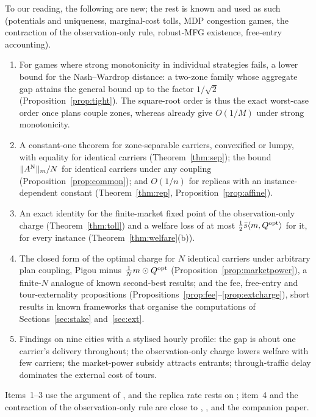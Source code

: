 \documentclass[preprint,11pt,authoryear]{elsarticle}
\theoremstyle{plain}
\theoremstyle{remark}
\begin{document}
To our reading, the following are new; the rest is known and used as such (potentials and uniqueness, marginal-cost tolls, MDP congestion games, the contraction of the observation-only rule, robust-MFG existence, free-entry accounting).
\begin{enumerate}
\item For games where strong monotonicity in individual strategies fails, a lower bound for the Nash--Wardrop distance: a two-zone family whose aggregate gap attains the general bound up to the factor $1/\sqrt2$ (Proposition~\ref{prop:tight}). The square-root order is thus the exact worst-case order once plans couple zones, whereas \citet{Paccagnan2019} already give $O(1/M)$ under strong monotonicity.
\item A constant-one theorem for zone-separable carriers, convexified or lumpy, with equality for identical carriers (Theorem~\ref{thm:sep}); the bound $\|A^{\mathrm{N}}\|_m/N$ for identical carriers under any coupling (Proposition~\ref{prop:common}); and $O(1/n)$ for replicas with an instance-dependent constant (Theorem~\ref{thm:rep}, Proposition~\ref{prop:affine}).
\item An exact identity for the finite-market fixed point of the observation-only charge (Theorem~\ref{thm:toll}) and a welfare loss of at most $\tfrac12\bar s\langle m,Q^{\mathrm{opt}}\rangle$ for it, for every instance (Theorem~\ref{thm:welfare}(b)).
\item The closed form of the optimal charge for $N$ identical carriers under arbitrary plan coupling, Pigou minus $\tfrac1N m\odot Q^{\mathrm{opt}}$ (Proposition~\ref{prop:marketpower}), a finite-$N$ analogue of known second-best results; and the fee, free-entry and tour-externality propositions (Propositions~\ref{prop:fee}--\ref{prop:extcharge}), short results in known frameworks that organise the computations of Sections~\ref{sec:stake} and~\ref{sec:ext}.
\item Findings on nine cities with a stylised hourly profile: the gap is about one carrier's delivery throughout; the observation-only charge lowers welfare with few carriers; the market-power subsidy attracts entrants; through-traffic delay dominates the external cost of tours.
\end{enumerate}
Items~1--3 use the argument of \citet{Paccagnan2019}, and the replica rate rests on \citet{Robinson1981}; item~4 and the contraction of the observation-only rule are close to \citet{Brueckner2002}, \citet{PelsVerhoef2004}, \citet{Yang2004} and the companion paper.
\end{document}
